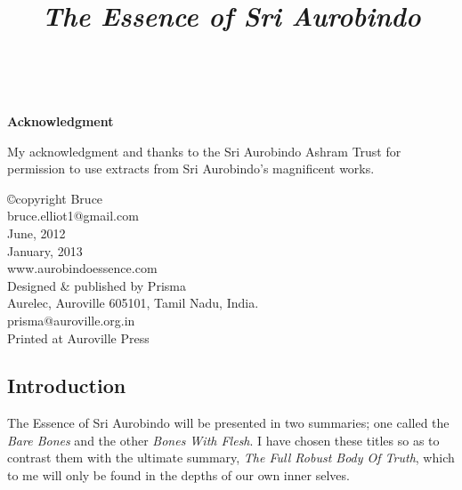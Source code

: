 \documentclass[12pt,a4paper]{book}
\title{
  {\emph{The Essence of Sri Aurobindo}}}
\date{}
\begin{document}

\Large
\thispagestyle{empty}
\maketitle


\
\vspace{2cm}
\begin{center}{\bf Acknowledgment}\end{center}
\thispagestyle{empty}

My acknowledgment and thanks to the Sri Aurobindo Ashram Trust for
permission to use extracts from Sri Aurobindo's magnificent works.

\vspace{0.5cm}

\begin{center}
\copyright copyright Bruce\\
bruce.elliot1@gmail.com\\
June, 2012\\
January, 2013\\
\vspace{1cm}
www.aurobindoessence.com\\
\vspace{2cm}
Designed \& published by Prisma\\
Aurelec, Auroville 605101, Tamil Nadu, India.\\
prisma@auroville.org.in\\
\vspace{0.5cm}
Printed at Auroville Press\\
\end{center}
\newpage

\pagestyle{plain}
\begin{center}\section*{Introduction}\end{center}

The Essence of Sri Aurobindo will be presented in two summaries; one
called the \emph{Bare Bones} and the other \emph{Bones With Flesh}. I
have chosen these titles so as to contrast them with the ultimate
summary, \emph{The Full Robust Body Of Truth}, which to me will only
be found in the depths of our own inner selves.
\end{document}

